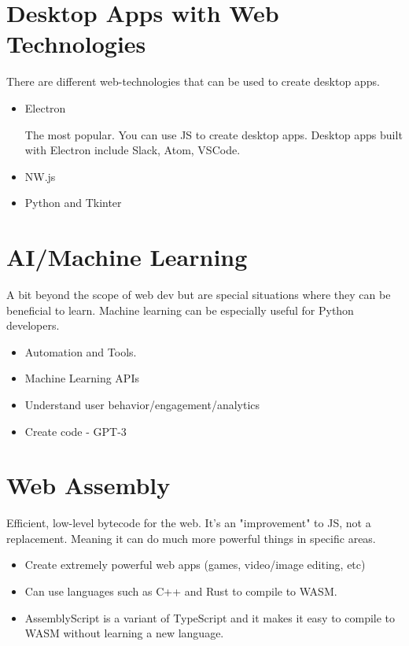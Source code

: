 \section{Desktop Apps with Web Technologies}

There are different web-technologies that can be used to create desktop apps. 
\begin{itemize}
    \item Electron
    
    The most popular. You can use JS to create desktop apps. Desktop apps built with Electron include Slack, Atom, VSCode.
    \item NW.js
    \item Python and Tkinter
\end{itemize}

\section{AI/Machine Learning}
A bit beyond the scope of web dev but are special situations where they can be beneficial to learn. Machine learning can be especially useful for Python developers.

\begin{itemize}
    \item Automation and Tools.
    \item Machine Learning APIs
    \item Understand user behavior/engagement/analytics
    \item Create code - GPT-3
\end{itemize}

\section{Web Assembly}
Efficient, low-level bytecode for the web. It's an "improvement" to JS, not a replacement. Meaning it can do much more powerful things in specific areas. 

\begin{itemize}
    \item Create extremely powerful web apps (games, video/image editing, etc)
    \item Can use languages such as C++ and Rust to compile to WASM. 
    \item AssemblyScript is a variant of TypeScript and it makes it easy to compile to WASM without learning a new language.
\end{itemize}

